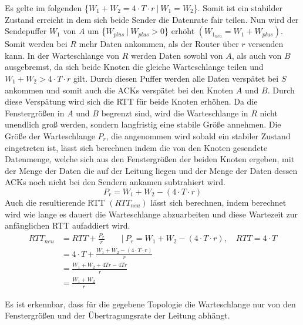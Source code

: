 \documentclass [10pt,a4paper]{article}
\begin{document}
		Es gelte im folgenden \{$W_1+W_2=4\cdot T\cdot r\ |\ W_1=W_2$\}. Somit ist ein stabilder Zustand erreicht in dem sich beide Sender die Datenrate fair teilen. Nun wird der Sendepuffer $W_1$ von $A$ um \{$W_{plus}\ |\ W_{plus}>0$\} erhöht $(W_{1_{neu}}=W_1+W_{plus})$. Somit werden bei $R$ mehr Daten ankommen, als der Router über $r$ versenden kann. In der Warteschlange von $R$ werden Daten sowohl von $A$, als auch von $B$ ausgebremst, da sich beide Knoten die gleiche Warteschlange teilen und $W_1+W_2>4\cdot T\cdot r$ gilt. Durch diesen Puffer werden alle Daten verspätet bei $S$ ankommen und somit auch die ACKs verspätet bei den Knoten $A$ und $B$. Durch diese Verspätung wird sich die RTT für beide Knoten erhöhen. Da die Fenstergrößen in $A$ und $B$ begrenzt sind, wird die Warteschlange in $R$ nicht unendlich groß werden, sondern langfristig eine stabile Größe annehmen. Die Größe der Warteschlange $P_r$, die angenommen wird sobald ein stabiler Zustand eingetreten ist, lässt sich berechnen indem die von den Knoten gesendete Datenmenge, welche sich aus den Fenstergrößen der beiden Knoten ergeben, mit der Menge der Daten die auf der Leitung liegen und der Menge der Daten dessen ACKs noch nicht bei den Sendern ankamen subtrahiert wird.
		\[P_r=W_1+W_2-( 4\cdot T\cdot r) \]
		Auch die resultierende RTT $(RTT_{neu})$ lässt sich berechnen, indem berechnet wird wie lange es dauert die Warteschlange abzuarbeiten und diese Wartezeit zur anfänglichen RTT aufaddiert wird.
		\begin{align*}
			RTT_{neu} &=RTT+\frac{P_r}{r} \qquad |\ P_r=W_1+W_2-( 4\cdot T\cdot r),\quad RTT=4\cdot T \\[1ex]
			&= 4\cdot T+\frac{W_1+W_2-( 4\cdot T\cdot r)}{r}\\[1ex]
			&= \frac{W_1+W_2+4Tr-4Tr}{r}\\[1ex]
			&= \frac{W_1+W_2}{r}
		\end{align*}
		
		Es ist erkennbar, dass für die gegebene Topologie die Warteschlange nur von den Fenstergrößen und der Übertragungsrate der Leitung abhängt.
		
\end{document}
